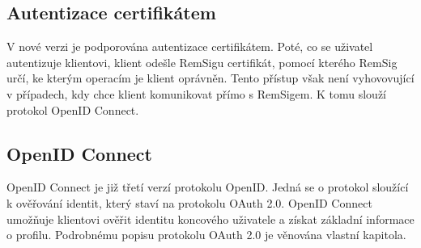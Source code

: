 \documentclass[]{fithesis3}
\begin{document}
		\subsection{Autentizace certifikátem}

		V nové verzi je podporována autentizace certifikátem. Poté, co se uživatel autentizuje 				klientovi, klient odešle RemSigu certifikát, pomocí kterého RemSig určí, ke kterým 				operacím je klient oprávněn. Tento přístup však není vyhovovující v případech, kdy chce 			klient komunikovat přímo s RemSigem. K tomu slouží protokol OpenID Connect.

		\subsection{OpenID Connect}

		OpenID Connect je již třetí verzí protokolu OpenID. Jedná se o protokol sloužící k 					ověřování identit, který staví na protokolu OAuth 2.0.  OpenID Connect umožňuje 				klientovi ověřit identitu koncového uživatele a získat základní informace o profilu. 					Podrobnému popisu protokolu OAuth 2.0 je věnována vlastní kapitola.
\end{document}
